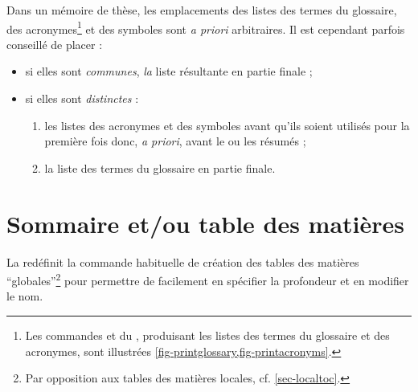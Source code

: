 
Dans un mémoire de thèse, les emplacements des listes des termes du glossaire,
des acronymes\footnote{Les commandes  et
   du , produisant les listes
  des termes du glossaire et des acronymes, sont illustrées
  \vref{fig-printglossary,fig-printacronyms}.} et des symboles sont \emph{a
  priori} arbitraires. Il est cependant parfois conseillé de placer :
\begin{itemize}
\item si elles sont \emph{communes}, \emph{la} liste résultante en partie finale ;
\item si elles sont \emph{distinctes} :
  \begin{enumerate}
  \item les listes des acronymes et des symboles avant qu'ils soient utilisés
    pour la première fois donc, \emph{a priori}, avant le ou les résumés ;
  \item la liste des termes du glossaire en partie finale.
  \end{enumerate}
\end{itemize}

\section{Sommaire et/ou table des matières}\label{sec-table-des-matieres}

La \yatCl{} redéfinit la commande  habituelle de
création des tables des matières \enquote{globales}\footnote{Par opposition aux
  tables des matières locales,
  cf. \vref{sec-localtoc}.} pour permettre de facilement en spécifier la
profondeur et en modifier le nom.

